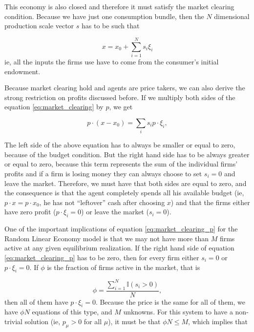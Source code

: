 This economy is also closed and therefore it must satisfy the market
clearing condition. Because we have just one consumption bundle, then
the $N$ dimensional production scale vector $s$ has to be such that

\begin{equation}
x = x_0 + \sum_{i=1}^N s_i \xi_i
\label{eq:market_clearing}
\end{equation}
ie, all the inputs the firms use have to come from the consumer's
initial endowment. 

Because market clearing hold and agents are price takers, we can also
derive the strong restriction on profits discussed before. If we
multiply both sides of the equation \eqref{eq:market_clearing} by $p$,
we get

\begin{equation}
  \label{eq:market_clearing_p}
  p\cdot (x - x_0) = \sum_i s_i p \cdot \xi_i,
\end{equation}

The left side of the above equation has to always be smaller or equal
to zero, because of the budget condition. But the right hand side has
to be always greater or equal to zero, because this term represents
the sum of the individual firms' profits and if a firm is losing money
they can always choose to set $s_i = 0$ and leave the
market. Therefore, we must have that both sides are equal to zero, and
the consequence is that the agent completely spends all his available
budget (ie, $p\cdot x = p \cdot x_0$, he has not ``leftover'' cash
after choosing $x$) and that the firms either have zero profit
($p\cdot \xi_i = 0$) or leave the market ($s_i = 0$).

One of the important implications of equation
\eqref{eq:market_clearing_p} for the Random Linear Economy model is
that we may not have more than $M$ firms active at any given
equilibrium realization. If the right hand side of equation
\eqref{eq:market_clearing_p} has to be zero, then for every firm
either $s_i = 0$ or $p\cdot \xi_i = 0$. If $\phi$ is the fraction of
firms active in the market, that is

\begin{equation}
  \label{eq:phi_def}
  \phi = \frac{\sum_{i=1}^N \mathds{I}(s_i > 0)}{N},
\end{equation}
then all of them have $p\cdot \xi_i = 0$. Because the price is the
same for all of them, we have $\phi N$ equations of this type, and $M$
unknowns. For this system to have a non-trivial solution (ie,
$p_\mu > 0$ for all $\mu$), it must be that $\phi N \leq M$, which
implies that

